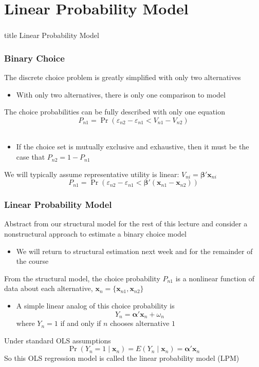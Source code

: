 \documentclass{beamer}\usepackage[]{graphicx}\usepackage[]{xcolor}
\begin{document}
\section{Linear Probability Model}
\label{lpm}
\begin{frame}\frametitle{}
    \vfill
    \centering
    \begin{beamercolorbox}[center]{title}
        \Large Linear Probability Model
    \end{beamercolorbox}
    \vfill
\end{frame}

\begin{frame}\frametitle{Binary Choice}
    The discrete choice problem is greatly simplified with only two alternatives
    \begin{itemize}
    	\item With only two alternatives, there is only one comparison to model
    \end{itemize}
    \vspace{3ex}
    The choice probabilities can be fully described with only one equation 
    $$P_{n1} = \Pr(\varepsilon_{n2} - \varepsilon_{n1} < V_{n1} - V_{n2})$$ \\
    \begin{itemize}
    	\item If the choice set is mutually exclusive and exhaustive, then it must be the case that $P_{n2} = 1 - P_{n1}$
    \end{itemize}
    \vspace{3ex}
    We will typically assume representative utility is linear: $V_{ni} = \bm{\beta}' \bm{x}_{ni}$
    $$P_{n1} = \Pr(\varepsilon_{n2} - \varepsilon_{n1} < \bm{\beta}' (\bm{x}_{n1} - \bm{x}_{n2}))$$
\end{frame}

\begin{frame}\frametitle{Linear Probability Model}
    Abstract from our structural model for the rest of this lecture and consider a nonstructural approach to estimate a binary choice model
    \begin{itemize}
    	\item We will return to structural estimation next week and for the remainder of the course
    \end{itemize}
    \vspace{2ex}
	From the structural model, the choice probability $P_{n1}$ is a nonlinear function of data about each alternative, $\bm{x}_n = \{\bm{x}_{n1}, \bm{x}_{n2}\}$
	\begin{itemize}
	  \item A simple linear analog of this choice probability is
    $$Y_n = \bm{\alpha}' \bm{x}_n + \omega_n$$
    where $Y_n = 1$ if and only if $n$ chooses alternative $1$
	\end{itemize}
    \vspace{2ex}
    Under standard OLS assumptions
    $$\Pr(Y_n = 1 \mid \bm{x}_n) = E(Y_n \mid \bm{x}_n) = \bm{\alpha}' \bm{x}_n$$
    So this OLS regression model is called the linear probability model (LPM)
\end{frame}
\end{document}
